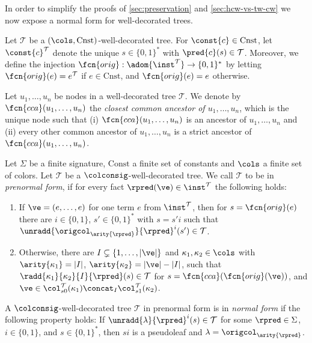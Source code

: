 In order to simplify the proofs of \cref{sec:preservation} and \cref{sec:hcw-vs-tw-cw} we now expose a normal form for well-decorated trees.
\begin{definition}\label{def:mso-orig}
	Let $\mathcal{T}$ be a $(\cols,\mathrm{Cnst})$-well-decorated tree.
	For $\const{c}\in \mathrm{Cnst}$, let $\const{c}^\mathcal{T}$ denote the unique $s \in \{0,1\}^*$ with $\pred{c}(s)\in \mathcal{T}$. Moreover, we define the injection $\fcn{orig}: \adom{\inst^\mathcal{T}} \to \{0,1\}^*$ 
	by letting $\fcn{orig}(e)=e^\mathcal{T}$ if $e\in \mathrm{Cnst}$, and $\fcn{orig}(e)=e$ otherwise.
\end{definition}
Let $u_1, \ldots, u_n$ be nodes in a well-decorated tree $\mathcal{T}$. We denote by $\fcn{cca}(u_1, \ldots, u_n)$ the \emph{closest common ancestor of $u_1, \ldots, u_n$}, which is the unique node such that (i) $\fcn{cca}(u_1, \ldots, u_n)$ is an ancestor of $u_1, \ldots, u_n$ and (ii) every other common ancestor of $u_1, \ldots, u_n$ is a strict ancestor of $\fcn{cca}(u_1, \ldots, u_n)$.


\begin{definition}
	Let $\Sigma$ be a finite signature, $\mathrm{Const}$ a finite set of constants and $\cols$ a finite set of colors. Let $\mathcal{T}$ be a $\colconsig$-well-decorated tree. We call $\mathcal{T}$ to be in \emph{prenormal form}, if for every fact $\rpred(\ve)\in\inst^{\mathcal{T}}$ the following holds: 
	\begin{enumerate}
		\item If $\ve = (e, \ldots, e)$ for one term $e$ from $\inst^{\mathcal{T}}$, then for $s = \fcn{orig}(e)$ there are $i\in\{ 0,1 \}$, $s'\in\{ 0,1 \}^*$ with $s = s'i$ such that $\unradd{\origcol_{\arity{\rpred}}}{\rpred}^{i}(s')\in\mathcal{T}$.
		\item Otherwise, there are $I\subsetneq \{ 1, \ldots, |\ve| \}$ and $\kappa_1, \kappa_2\in\cols$ with $\arity{\kappa_1} = |I|$, $\arity{\kappa_2} = |\ve|-|I|$, such that
$\radd{\kappa_1}{\kappa_2}{I}{\rpred}(s) \in\mathcal{T}$ for $s = \fcn{cca}(\fcn{orig}(\ve))$, and $\ve \in \col_{s0}^{\mathcal{T}}(\kappa_1) \concat_{I} \col_{s1}^{\mathcal{T}}(\kappa_2)$.
	\end{enumerate}
	A $\colconsig$-well-decorated tree $\mathcal{T}$ in prenormal form is in \emph{normal form} if the following property holds: If $\unradd{\lambda}{\rpred}^{i}(s)\in\mathcal{T}$ for some $\rpred\in\Sigma$, $i\in\{ 0,1 \}$, and $s\in\{ 0,1 \}^*$, then $si$ is a pseudoleaf and $\lambda = \origcol_{\arity{\rpred}}$.
\end{definition}

